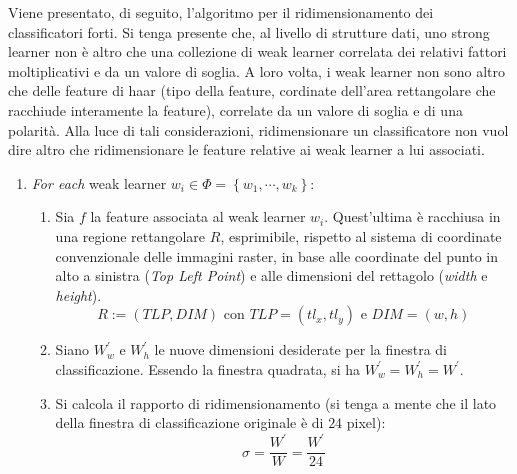         Viene presentato, di seguito, l'algoritmo per il ridimensionamento dei classificatori forti. 
        Si tenga presente che, al livello di strutture dati, uno strong learner non è altro che una collezione di weak learner correlata dei relativi fattori moltiplicativi e da un valore di soglia.
        A loro volta, i weak learner non sono altro che delle feature di haar (tipo della feature, cordinate dell'area rettangolare che racchiude interamente la feature), correlate da un valore di soglia e di una polarità.
        Alla luce di tali considerazioni, ridimensionare un classificatore non vuol dire altro che ridimensionare le feature relative ai weak learner a lui associati.

        \begin{enumerate}
            \item \emph{For each} weak learner $w_i \in \Phi = \left\{w_1, \cdots, w_k\right\}$: 
            \begin{enumerate}
                \item Sia $f$ la feature associata al weak learner $w_i$.
                Quest'ultima è racchiusa in una regione rettangolare $R$, esprimibile, rispetto al sistema di coordinate convenzionale delle immagini raster, in base alle coordinate del punto in alto a sinistra (\emph{Top Left Point}) e alle dimensioni del rettagolo (\emph{width} e \emph{height}).
                \begin{equation}
                    \label{subeq:rectangular_region}
                    R := (TLP, DIM) \text{ con } TLP = (tl_x, tl_y) \text{ e } DIM = (w, h)
                \end{equation}

                \item Siano ${W}^{'}_{w}$ e ${W}^{'}_{h}$ le nuove dimensioni desiderate per la finestra di classificazione.
                Essendo la finestra quadrata, si ha ${W}^{'}_{w} = {W}^{'}_{h} = W^{'}$.

                \item Si calcola il rapporto di ridimensionamento (si tenga a mente che il lato della finestra di classificazione originale è di $24$ pixel):
                \begin{equation}
                    \label{subeq:scale_ratio}
                    \sigma = \frac{W^{'}}{W} = \frac{W^{'}}{24}
                \end{equation}


\end{enumerate}
\end{enumerate}

